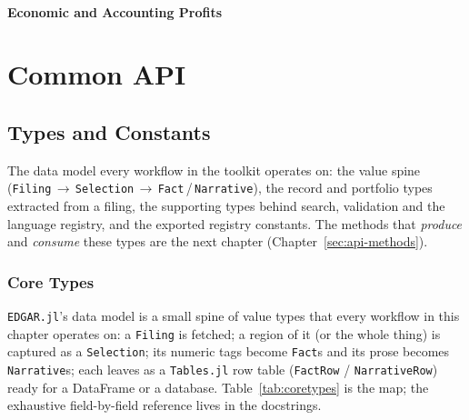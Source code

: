 \documentclass[11pt,a4paper]{report}
\begin{document}
\subsection{Economic and Accounting Profits}

\part{Common API}

\chapter{Types and Constants}
\label{sec:api}

The data model every workflow in the toolkit operates on: the value spine
(\texttt{Filing}\,$\to$\,\texttt{Selection}\,$\to$\,\texttt{Fact}\,/\,\texttt{Narrative}), the record and
portfolio types extracted from a filing, the supporting types behind search, validation and the language
registry, and the exported registry constants. The methods that \emph{produce} and \emph{consume} these types
are the next chapter (Chapter~\ref{sec:api-methods}).

\section{Core Types}
\label{sec:api-types}

\texttt{EDGAR.jl}'s data model is a small spine of value types that every workflow in this chapter operates
on: a \texttt{Filing} is fetched; a region of it (or the whole thing) is captured as a \texttt{Selection};
its numeric tags become \texttt{Fact}s and its prose becomes \texttt{Narrative}s; each leaves as a
\texttt{Tables.jl} row table (\texttt{FactRow} / \texttt{NarrativeRow}) ready for a DataFrame or a database.
Table~\ref{tab:coretypes} is the map; the exhaustive field-by-field reference lives in the docstrings.
\end{document}
